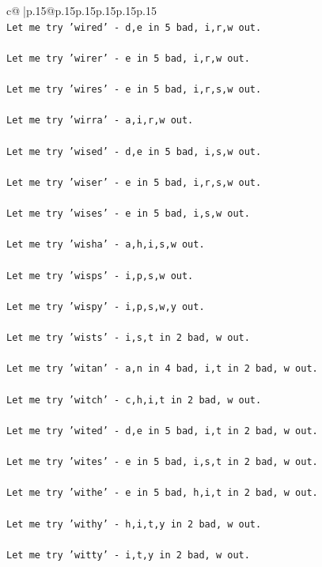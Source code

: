 \documentclass{article}
\begin{document}
{\begin{supertabular}{c@{$\;$}|p{.15\linewidth}@{}p{.15\linewidth}p{.15\linewidth}p{.15\linewidth}p{.15\linewidth}p{.15\linewidth}}
{{{\\ 
\texttt{Let me try 'wired' {-} d,e in 5 bad, i,r,w out. } \\
\\ 
\texttt{Let me try 'wirer' {-} e in 5 bad, i,r,w out. } \\
\\ 
\texttt{Let me try 'wires' {-} e in 5 bad, i,r,s,w out. } \\
\\ 
\texttt{Let me try 'wirra' {-} a,i,r,w out. } \\
\\ 
\texttt{Let me try 'wised' {-} d,e in 5 bad, i,s,w out. } \\
\\ 
\texttt{Let me try 'wiser' {-} e in 5 bad, i,r,s,w out. } \\
\\ 
\texttt{Let me try 'wises' {-} e in 5 bad, i,s,w out. } \\
\\ 
\texttt{Let me try 'wisha' {-} a,h,i,s,w out. } \\
\\ 
\texttt{Let me try 'wisps' {-} i,p,s,w out. } \\
\\ 
\texttt{Let me try 'wispy' {-} i,p,s,w,y out. } \\
\\ 
\texttt{Let me try 'wists' {-} i,s,t in 2 bad, w out. } \\
\\ 
\texttt{Let me try 'witan' {-} a,n in 4 bad, i,t in 2 bad, w out. } \\
\\ 
\texttt{Let me try 'witch' {-} c,h,i,t in 2 bad, w out. } \\
\\ 
\texttt{Let me try 'wited' {-} d,e in 5 bad, i,t in 2 bad, w out. } \\
\\ 
\texttt{Let me try 'wites' {-} e in 5 bad, i,s,t in 2 bad, w out. } \\
\\ 
\texttt{Let me try 'withe' {-} e in 5 bad, h,i,t in 2 bad, w out. } \\
\\ 
\texttt{Let me try 'withy' {-} h,i,t,y in 2 bad, w out. } \\
\\ 
\texttt{Let me try 'witty' {-} i,t,y in 2 bad, w out. } \\
\\ 
}}}
\end{supertabular}}
\end{document}
